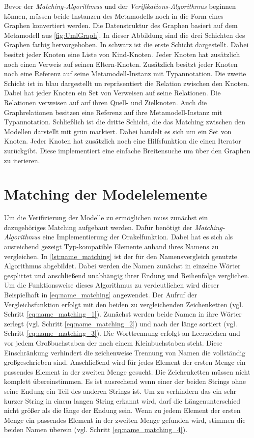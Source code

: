 Bevor der \emph{Matching-Algorithmus} und der \emph{Verifikations-Algorithmus} beginnen können, müssen beide Instanzen des Metamodells noch in die Form eines Graphen konvertiert werden.
Die Datenstruktur des Graphen basiert auf dem Metamodell aus \cref{fig:UmlGraph}.
In dieser Abbildung sind die drei Schichten des Graphen farbig hervorgehoben.
In schwarz ist die erste Schicht dargestellt.
Dabei besitzt jeder Knoten eine Liste von Kind-Knoten.
Jeder Knoten hat zusätzlich noch einen Verweis auf seinen Eltern-Knoten.
Zusätzlich besitzt jeder Knoten noch eine Referenz auf seine Metamodell-Instanz mit Typannotation.
Die zweite Schicht ist in blau dargestellt un repräsentiert die Relation zwischen den Knoten.
Dabei hat jeder Knoten ein Set von Verweisen auf seine Relationen.
Die Relationen verweisen auf auf ihren Quell- und Zielknoten.
Auch die Graphrelationen besitzen eine Referenz auf ihre Metamodell-Instanz mit Typannotation.
Schließlich ist die dritte Schicht, die das Matching zwischen den Modellen darstellt mit grün markiert.
Dabei handelt es sich um ein Set von Knoten.
Jeder Knoten hat zusätzlich noch eine Hilfsfunktion die einen Iterator zurückgibt.
Diese implementiert eine einfache Breitensuche um über den Graphen zu iterieren.

\section{Matching der Modelelemente}
\label{sec:matching_model_elements}

Um die Verifizierung der Modelle zu ermöglichen muss zunächst ein dazugehöriges Matching aufgebaut werden.
Dafür benötigt der \emph{Matching-Algorithmus} eine Implementierung der Orakelfunktion.
Dabei hat es sich als ausreichend gezeigt Typ-kompatible Elemente anhand ihres Namens zu vergleichen.
In \cref{lst:name_matching} ist der für den Namensvergleich genutzte Algorithmus abgebildet.
Dabei werden die Namen zunächst in einzelne Wörter gesplittet und anschließend unabhängig ihrer Endung und Reihenfolge verglichen.
Um die Funktionsweise dieses Algorithmus zu verdeutlichen wird dieser Beispielhaft in \cref{eq:name_matching} angewendet.
Der Aufruf der Vergleichsfunktion erfolgt mit den beiden zu vergleichenden Zeichenketten (vgl. Schritt \ref{eq:name_matching_1}).
Zunächst werden beide Namen in ihre Wörter zerlegt (vgl. Schritt \ref{eq:name_matching_2}) und nach der länge sortiert (vgl. Schritt \ref{eq:name_matching_3}).
Die Worttrennung erfolgt an Leerzeichen und vor jedem Großbuchstaben der nach einem Kleinbuchstaben steht.
Diese Einschränkung verhindert die zeichenweise Trennung von Namen die vollständig großgeschrieben sind.
Anschließend wird für jedes Element der ersten Menge ein passendes Element in der zweiten Menge gesucht.
Die Zeichenketten müssen nicht komplett übereinstimmen.
Es ist ausrechend wenn einer der beiden Strings ohne seine Endung ein Teil des anderen Strings ist.
Um zu verhindern das ein sehr kurzer String in einem langen String erkannt wird, darf die Längenunterschied nicht größer als die länge der Endung sein.
Wenn zu jedem Element der ersten Menge ein passendes Element in der zweiten Menge gefunden wird, stimmen die beiden Namen überein (vgl. Schritt \ref{eq:name_matching_4}).

